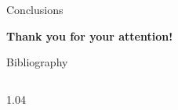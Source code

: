 \documentclass{beamer}
\begin{document}
\begin{frame}{Conclusions}
\end{frame}



\begin{frame} %
    \begin{center}
            \LARGE{\textbf{Thank you for your attention!}}
    \end{center}
\end{frame}
\begin{frame}{Bibliography} %
\begin{columns}
    \begin{column}{1.04\framewidth}
            \setlength{\leftmargini}{1.05em}
    
   {\footnotesize }
    \end{column}
\end{columns}

\end{frame}
\end{document}
